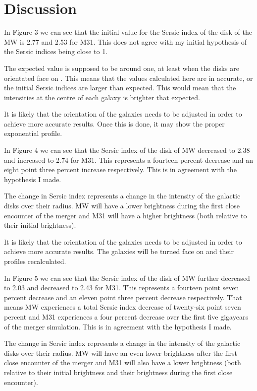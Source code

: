 \documentclass[linenumbers,trackchanges]{aastex7}
\begin{document}
\section{Discussion} \label{sec:style}

In Figure 3 we can see that the initial value for the Sersic index of
the disk of the MW is 2.77 and 2.53 for M31. This does not agree with
my initial hypothesis of the Sersic indices being close to 1.

The expected value is supposed to be around one, at least when the
disks are orientated face on \citep{Pastrav_Popescu_Tuffs_Sansom_2013}.
This means that the values calculated here are in accurate, or the
initial Sersic indices  are larger than expected. This would mean that
the intensities at the centre of each galaxy is brighter that expected.

It is likely that the orientation of the galaxies needs to be adjusted
in order to achieve more accurate results. Once this is done, it may
show the proper exponential profile.

In Figure 4 we can see that the Sersic index of the disk of MW
decreased to 2.38 and increased to 2.74 for M31. This represents a
fourteen percent decrease and an eight point three percent increase
respectively. This is in agreement with the hypothesis I made.

The change in Sersic index represents a change in the intensity of the
galactic disks over their radius. MW will have a lower brightness
during the first close encounter of the merger and M31 will have a
higher brightness (both relative to their initial brightness).

It is likely that the orientation of the galaxies needs to be adjusted
in order to achieve more accurate results. The galaxies will be turned
face on and their profiles recalculated.

In Figure 5 we can see that the Sersic index of the disk of MW
further decreased to 2.03 and decreased to 2.43 for M31. This
represents a fourteen point seven percent decrease and an eleven point
three percent decrease respectively. That means MW experiences a total
Sersic index decrease of twenty-six point seven percent and M31
experiences a four percent decrease over the first five gigayears of
the merger simulation. This is in agreement with the hypothesis I made.

The change in Sersic index represents a change in the intensity of the
galactic disks over their radius. MW will have an even lower brightness
after the first close encounter of the merger and M31 will also have a
lower brightness (both relative to their initial brightness and their
brightness during the first close encounter).
\end{document}
